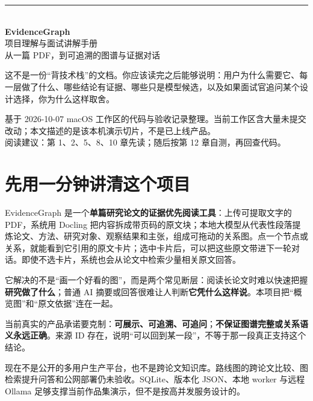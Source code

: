 \documentclass[UTF8,11pt,a4paper,fontset=fandol]{ctexart}
\newcommand{\term}[1]{\textbf{#1}}
\begin{document}
\begin{titlepage}
\vspace*{34mm}
{\color{egpurple}\rule{38mm}{2.4pt}}\\[13mm]
{\Huge\bfseries EvidenceGraph}\\[3mm]
{\LARGE 项目理解与面试讲解手册}\\[8mm]
{\large 从一篇 PDF，到可追溯的图谱与证据对话}\\[18mm]
\begin{tcolorbox}[colback=egpaper,colframe=egline,boxrule=.7pt,arc=2mm,width=.94\textwidth]
\large 这不是一份“背技术栈”的文档。你应该读完之后能够说明：用户为什么需要它、每一层做了什么、哪些结论有证据、哪些只是模型候选，以及如果面试官追问某个设计选择，你为什么这样取舍。
\end{tcolorbox}
\vfill
{\small\color{egmuted} 基于 2026-10-07 macOS 工作区的代码与验收记录整理。当前工作区含大量未提交改动；本文描述的是该本机演示切片，不是已上线产品。}\\[3mm]
{\small\color{egmuted} 阅读建议：第 1、2、5、8、10 章先读；随后按第 12 章自测，再回查代码。}
\end{titlepage}

\tableofcontents
\newpage

\section{先用一分钟讲清这个项目}

\begin{keybox}
EvidenceGraph 是一个\term{单篇研究论文的证据优先阅读工具}：上传可提取文字的 PDF，系统用 Docling 把内容拆成带页码的原文块；本地大模型从代表性段落提炼论文、方法、研究对象、观察结果和主张，组成可拖动的关系图。点一个节点或关系，就能看到它引用的原文卡片；选中卡片后，可以把这些原文带进下一轮对话。即使不选卡片，系统也会从论文中检索少量相关原文回答。
\end{keybox}

它解决的不是“画一个好看的图”，而是两个常见断层：阅读长论文时难以快速把握\term{研究做了什么}；普通 AI 摘要或回答很难让人判断\term{它凭什么这样说}。本项目把“概览图”和“原文依据”连在一起。

当前真实的产品承诺要克制：\term{可展示、可追溯、可追问}；\term{不保证图谱完整或关系语义永远正确}。来源 ID 存在，说明“可以回到某一段”，不等于那一段真正支持这个结论。

\begin{limitbox}
现在不是公开的多用户生产平台，也不是跨论文知识库。路线图的跨论文比较、图检索提升问答和公网部署仍未验收。SQLite、版本化 JSON、本地 worker 与远程 Ollama 足够支撑当前作品集演示，但不是按高并发服务设计的。
\end{limitbox}
\end{document}
